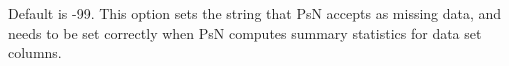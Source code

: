 Default is -99. This option sets the string that PsN accepts as missing data, and needs to be set correctly when PsN computes summary statistics for data set columns.
\nextopt
